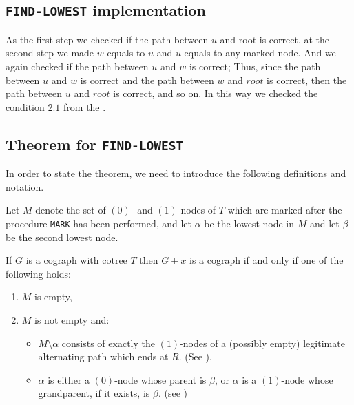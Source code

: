\subsection{\texttt{FIND-LOWEST} implementation}
As the first step we checked if the path between $u$ and root is correct, at the second step we made $w$ equals to $u$ and $u$ equals to any marked node. And we again checked if the path between $u$ and $w$ is correct; Thus, since the path between $u$ and $w$ is correct and the path between $w$ and $root$ is correct, then the path between $u$ and $root$ is correct, and so on. In this way we checked the condition $2.1$ from the .

\subsection{Theorem for \texttt{FIND-LOWEST}}
        
In order to state the theorem, we need to introduce the following definitions and notation. 

Let $M$ denote the set of $(0)$- and $(1)$-nodes of $T$ which are marked after the procedure \texttt{MARK} has been performed, and let $\alpha$ be the lowest node in $M$ and let $\beta$ be the second lowest node. 



\begin{theorem}
\label{theorem_adding}
If $G$ is a cograph with cotree $T$ then $G+x$ is a cograph if and only if one of the following holds:
\begin{enumerate}
    \item $M$ is empty,
    \item $M$ is not empty and:
    \begin{itemize}
        \item $M \setminus \alpha $ consists of exactly the $(1)$-nodes of a (possibly empty) legitimate alternating path which ends at $R$. (See ),
\item $\alpha$ is either a $(0)$-node whose parent is $\beta$, or $\alpha$ is a $(1)$-node whose grandparent, if it exists, is $\beta$. (see )
    \end{itemize}
\end{enumerate}
\end{theorem}

